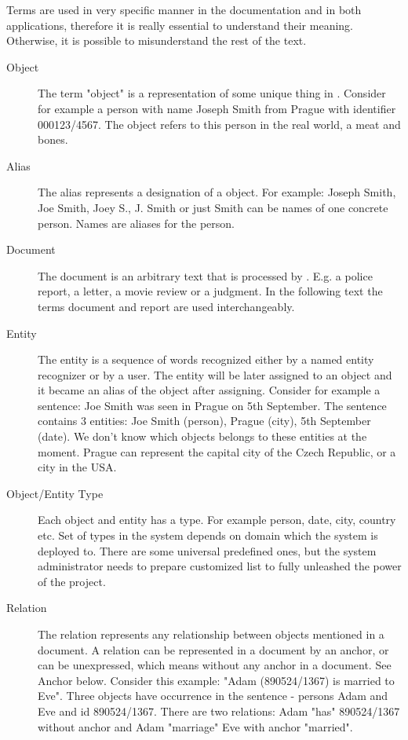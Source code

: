 Terms are used in very specific manner in the documentation and in both applications,
therefore it is really essential to understand their meaning. Otherwise, it is
possible to misunderstand the rest of the text.

\begin{description}
\item[Object]
The term "object" is a representation of some unique thing in \textan{}. Consider
for example a person with name Joseph Smith from Prague with identifier 000123/4567.
The object refers to this person in the real world, a meat and bones.

\item[Alias]
The alias represents a designation of a object. For example: Joseph Smith, Joe
Smith, Joey S., J. Smith or just Smith can be names of one concrete person.
Names are aliases for the person.


\item[Document]
The document is an arbitrary text that is processed by \textan{}. E.g. a police
report, a letter, a movie review or a judgment. In the following text the terms
document and report are used interchangeably.

\item[Entity]
The entity is a sequence of words recognized either by a named entity recognizer
or by a user. The entity will be later assigned to an object and it became an alias
of the object after assigning. Consider for example a sentence: Joe Smith was seen
in Prague on 5th September. The sentence contains 3 entities: Joe Smith (person),
Prague (city), 5th September (date). We don't know which objects belongs to these
entities at the moment. Prague can represent the capital city of the Czech Republic,
or a city in the USA.

\item[Object/Entity Type]
Each object and entity has a type. For example person, date, city, country etc.
Set of types in the system depends on domain which the system is deployed to.
There are some universal predefined ones, but the system administrator needs to
prepare customized list to fully unleashed the power of the project.

\item[Relation]
The relation represents any relationship between objects mentioned in a document.
A relation can be represented in a document by an anchor, or can be unexpressed,
which means without any anchor in a document. See Anchor below.
Consider this example: "Adam (890524/1367) is married to Eve". Three objects
have occurrence in the sentence - persons Adam and Eve and id 890524/1367. There
are two relations: Adam "has" 890524/1367 without anchor and Adam "marriage" Eve
with anchor "married".


\end{description}
